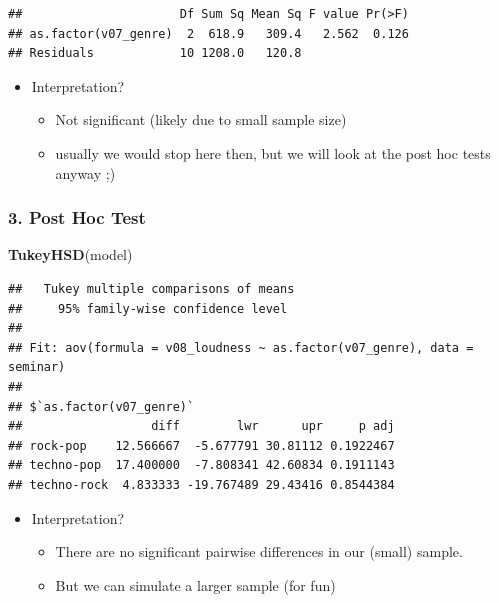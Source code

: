 \documentclass[
]{book}
\newenvironment{Shaded}{\begin{snugshade}}{\end{snugshade}}
\newcommand{\FunctionTok}[1]{\textcolor[rgb]{0.13,0.29,0.53}{\textbf{#1}}}
\newcommand{\NormalTok}[1]{#1}
\providecommand{\tightlist}{%
  \setlength{\itemsep}{0pt}\setlength{\parskip}{0pt}}
\begin{document}
\begin{verbatim}
##                      Df Sum Sq Mean Sq F value Pr(>F)
## as.factor(v07_genre)  2  618.9   309.4   2.562  0.126
## Residuals            10 1208.0   120.8
\end{verbatim}

\begin{itemize}
\tightlist
\item
  Interpretation?

  \begin{itemize}
  \tightlist
  \item
    Not significant (likely due to small sample size)
  \item
    usually we would stop here then, but we will look at the post hoc tests anyway ;)
  \end{itemize}
\end{itemize}

\subsubsection{3. Post Hoc Test}\label{post-hoc-test}

\begin{Shaded}
\begin{Highlighting}[]
\FunctionTok{TukeyHSD}\NormalTok{(model)}
\end{Highlighting}
\end{Shaded}

\begin{verbatim}
##   Tukey multiple comparisons of means
##     95% family-wise confidence level
## 
## Fit: aov(formula = v08_loudness ~ as.factor(v07_genre), data = seminar)
## 
## $`as.factor(v07_genre)`
##                  diff        lwr      upr     p adj
## rock-pop    12.566667  -5.677791 30.81112 0.1922467
## techno-pop  17.400000  -7.808341 42.60834 0.1911143
## techno-rock  4.833333 -19.767489 29.43416 0.8544384
\end{verbatim}

\begin{itemize}
\tightlist
\item
  Interpretation?

  \begin{itemize}
  \tightlist
  \item
    There are no significant pairwise differences in our (small) sample.
  \item
    But we can simulate a larger sample (for fun)
  \end{itemize}
\end{itemize}
\end{document}
